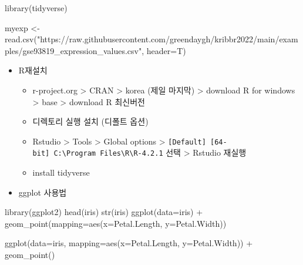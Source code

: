 \documentclass[
]{book}
\newenvironment{Shaded}{\begin{snugshade}}{\end{snugshade}}
\newcommand{\AttributeTok}[1]{\textcolor[rgb]{0.77,0.63,0.00}{#1}}
\newcommand{\FunctionTok}[1]{\textcolor[rgb]{0.00,0.00,0.00}{#1}}
\newcommand{\NormalTok}[1]{#1}
\newcommand{\OtherTok}[1]{\textcolor[rgb]{0.56,0.35,0.01}{#1}}
\newcommand{\SpecialCharTok}[1]{\textcolor[rgb]{0.00,0.00,0.00}{#1}}
\newcommand{\StringTok}[1]{\textcolor[rgb]{0.31,0.60,0.02}{#1}}
\providecommand{\tightlist}{%
  \setlength{\itemsep}{0pt}\setlength{\parskip}{0pt}}
\begin{document}
\begin{Shaded}
\begin{Highlighting}[]
\FunctionTok{library}\NormalTok{(tidyverse)}

\NormalTok{myexp }\OtherTok{\textless{}{-}} \FunctionTok{read.csv}\NormalTok{(}\StringTok{"https://raw.githubusercontent.com/greendaygh/kribbr2022/main/examples/gse93819\_expression\_values.csv"}\NormalTok{, }\AttributeTok{header=}\NormalTok{T)}
\end{Highlighting}
\end{Shaded}

\begin{itemize}
\tightlist
\item
  R재설치

  \begin{itemize}
  \tightlist
  \item
    r-project.org \textgreater{} CRAN \textgreater{} korea (제일 마지막) \textgreater{} download R for windows \textgreater{} base \textgreater{} download R 최신버전
  \item
    디렉토리 실행 설치 (디폴트 옵션)
  \item
    Rstudio \textgreater{} Tools \textgreater{} Global options \textgreater{} \texttt{{[}Default{]}\ {[}64-bit{]}\ C:\textbackslash{}Program\ Files\textbackslash{}R\textbackslash{}R-4.2.1} 선택 \textgreater{} Rstudio 재실행
  \item
    install tidyverse
  \end{itemize}
\item
  ggplot 사용법
\end{itemize}

\begin{Shaded}
\begin{Highlighting}[]
\FunctionTok{library}\NormalTok{(ggplot2)}
\FunctionTok{head}\NormalTok{(iris)}
\FunctionTok{str}\NormalTok{(iris)}
\FunctionTok{ggplot}\NormalTok{(}\AttributeTok{data=}\NormalTok{iris) }\SpecialCharTok{+} 
  \FunctionTok{geom\_point}\NormalTok{(}\AttributeTok{mapping=}\FunctionTok{aes}\NormalTok{(}\AttributeTok{x=}\NormalTok{Petal.Length, }\AttributeTok{y=}\NormalTok{Petal.Width))}
\end{Highlighting}
\end{Shaded}

\begin{Shaded}
\begin{Highlighting}[]
\FunctionTok{ggplot}\NormalTok{(}\AttributeTok{data=}\NormalTok{iris, }\AttributeTok{mapping=}\FunctionTok{aes}\NormalTok{(}\AttributeTok{x=}\NormalTok{Petal.Length, }\AttributeTok{y=}\NormalTok{Petal.Width)) }\SpecialCharTok{+}
  \FunctionTok{geom\_point}\NormalTok{()}
\end{Highlighting}
\end{Shaded}
\end{document}
